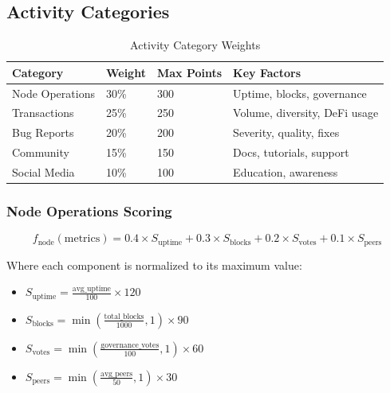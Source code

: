 \documentclass[11pt,a4paper]{article}
\begin{document}
\subsection{Activity Categories}

\begin{table}[h]
\centering
\begin{tabular}{|l|l|l|l|}
\hline
\textbf{Category} & \textbf{Weight} & \textbf{Max Points} & \textbf{Key Factors} \\ \hline
Node Operations   & 30\%            & 300                 & Uptime, blocks, governance \\ \hline
Transactions      & 25\%            & 250                 & Volume, diversity, DeFi usage \\ \hline
Bug Reports       & 20\%            & 200                 & Severity, quality, fixes \\ \hline
Community         & 15\%            & 150                 & Docs, tutorials, support \\ \hline
Social Media      & 10\%            & 100                 & Education, awareness \\ \hline
\end{tabular}
\caption{Activity Category Weights}
\end{table}

\subsubsection{Node Operations Scoring}

\begin{equation}
f_{\text{node}}(\text{metrics}) = 0.4 \times S_{\text{uptime}} + 0.3 \times S_{\text{blocks}} + 0.2 \times S_{\text{votes}} + 0.1 \times S_{\text{peers}}
\end{equation}

Where each component is normalized to its maximum value:
\begin{itemize}
    \item $S_{\text{uptime}} = \frac{\text{avg\_uptime}}{100} \times 120$
    \item $S_{\text{blocks}} = \min\left(\frac{\text{total\_blocks}}{1000}, 1\right) \times 90$
    \item $S_{\text{votes}} = \min\left(\frac{\text{governance\_votes}}{100}, 1\right) \times 60$
    \item $S_{\text{peers}} = \min\left(\frac{\text{avg\_peers}}{50}, 1\right) \times 30$
\end{itemize}
\end{document}
